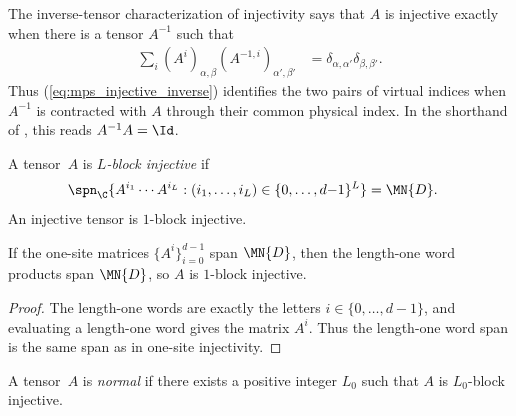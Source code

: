 The inverse-tensor characterization of injectivity says that $A$ is
injective exactly when there is a tensor $A^{-1}$ such that
\begin{align}
    \sum_i (A^i)_{\alpha,\beta}(A^{-1,i})_{\alpha',\beta'}
     & =
    \delta_{\alpha,\alpha'}\delta_{\beta,\beta'}.
    \label{eq:mps_injective_inverse}
\end{align}
Thus (\ref{eq:mps_injective_inverse}) identifies the two pairs of virtual
indices when $A^{-1}$ is contracted with $A$ through their common physical
index. In the shorthand of
\cite[Section~2.3, lines~324--331]{Cirac2016MPDO_arXiv}, this reads
$A^{-1}A=\Id$.

\begin{definition}\label{def:l_blk_injective}
    \leanok
    A tensor~$A$ is \emph{$L$-block injective} if
    \begin{align}
        \spn_{\C}\{A^{i_1} \cdots A^{i_L}
        : (i_1,\ldots,i_L) \in \{0,\ldots,d{-}1\}^L\}
         & = \MN{D}.
        \label{eq:mps_block_injective}
    \end{align}
    An injective tensor is $1$-block injective.
\end{definition}

\begin{lemma}
    \label{lem:one_block_injective_of_injective}
    \leanok
    If the one-site matrices $\{A^i\}_{i=0}^{d-1}$ span $\MN{D}$, then the
    length-one word products span $\MN{D}$, so $A$ is $1$-block injective.
\end{lemma}

\begin{proof}
    \leanok
    The length-one words are exactly the letters $i \in \{0,\ldots,d{-}1\}$, and
    evaluating a length-one word gives the matrix $A^i$. Thus the length-one
    word span is the same span as in one-site injectivity.
\end{proof}

\begin{definition}\label{def:normal}
    \leanok
    A tensor~$A$ is \emph{normal}
    \cite{Cirac2021Matrix}
    if there exists a positive integer $L_0$ such that $A$ is $L_0$-block
    injective.
\end{definition}

